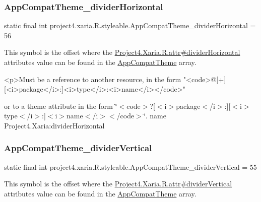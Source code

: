 \subsubsection{\texorpdfstring{App\+Compat\+Theme\+\_\+divider\+Horizontal}{AppCompatTheme\_dividerHorizontal}}
{\footnotesize\ttfamily static final int project4.\+xaria.\+R.\+styleable.\+App\+Compat\+Theme\+\_\+divider\+Horizontal = 56\hspace{0.3cm}{\ttfamily [static]}}

This symbol is the offset where the \hyperlink{}{Project4.\+Xaria.\+R.\+attr\#divider\+Horizontal} attribute\textquotesingle{}s value can be found in the \hyperlink{classproject4_1_1xaria_1_1R_1_1styleable_aad8bec413e2350f9404e6ff0e831a85d}{App\+Compat\+Theme} array.

\begin{DoxyVerb}      <p>Must be a reference to another resource, in the form "<code>@[+][<i>package</i>:]<i>type</i>:<i>name</i></code>"
\end{DoxyVerb}
 or to a theme attribute in the form \char`\"{}$<$code$>$?\mbox{[}$<$i$>$package$<$/i$>$\+:\mbox{]}\mbox{[}$<$i$>$type$<$/i$>$\+:\mbox{]}$<$i$>$name$<$/i$>$$<$/code$>$\char`\"{}.  name Project4.\+Xaria\+:divider\+Horizontal \mbox{\label{classproject4_1_1xaria_1_1R_1_1styleable_a2fa98253e4b6f3756570cd37fb944000}} 
\subsubsection{\texorpdfstring{App\+Compat\+Theme\+\_\+divider\+Vertical}{AppCompatTheme\_dividerVertical}}
{\footnotesize\ttfamily static final int project4.\+xaria.\+R.\+styleable.\+App\+Compat\+Theme\+\_\+divider\+Vertical = 55\hspace{0.3cm}{\ttfamily [static]}}

This symbol is the offset where the \hyperlink{}{Project4.\+Xaria.\+R.\+attr\#divider\+Vertical} attribute\textquotesingle{}s value can be found in the \hyperlink{classproject4_1_1xaria_1_1R_1_1styleable_aad8bec413e2350f9404e6ff0e831a85d}{App\+Compat\+Theme} array.

